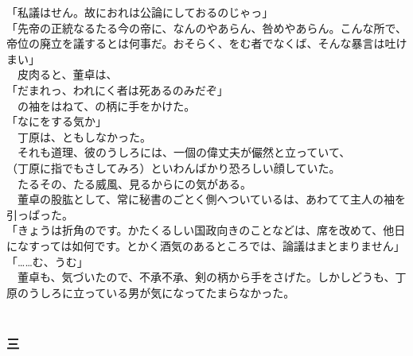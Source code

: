 \documentclass[
  paper=a5,
  fontsize=10pt,
  jafontsize=9.5pt,
  tate,                  %
  open_bracket_pos=nibu, %
]{jlreq}
\begin{document}
「私議はせん。故におれは公論にしておるのじゃっ」\\


「先帝の正統なるたる今の帝に、なんのやあらん、咎めやあらん。こんな所で、帝位の廃立を議するとは何事だ。おそらく、をむ者でなくば、そんな暴言は吐けまい」\\


　皮肉ると、董卓は、\\


「だまれっ、われにく者は死あるのみだぞ」\\


　の袖をはねて、の柄に手をかけた。\\


「なにをする気か」\\


　丁原は、ともしなかった。\\


　それも道理、彼のうしろには、一個の偉丈夫が儼然と立っていて、\\


（丁原に指でもさしてみろ）といわんばかり恐ろしい顔していた。\\


　たるその、たる威風、見るからにの気がある。\\


　董卓の股肱として、常に秘書のごとく側へついているは、あわてて主人の袖を引っぱった。\\


「きょうは折角のです。かたくるしい国政向きのことなどは、席を改めて、他日になすっては如何です。とかく酒気のあるところでは、論議はまとまりません」\\


「……む、うむ」\\


　董卓も、気づいたので、不承不承、剣の柄から手をさげた。しかしどうも、丁原のうしろに立っている男が気になってたまらなかった。\\

\\

\subsubsection{三}
\end{document}
